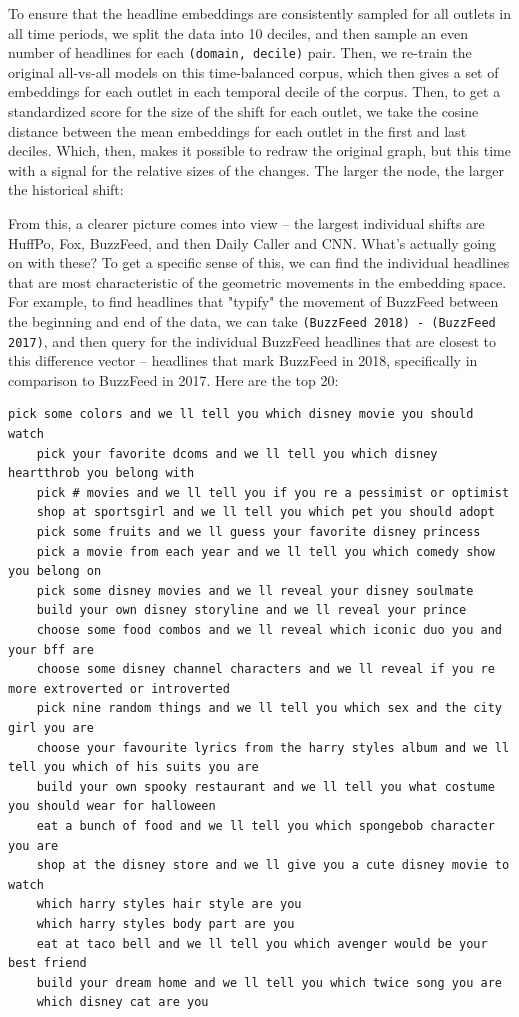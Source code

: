 \documentclass{scrartcl}
\begin{document}
To ensure that the headline embeddings are consistently sampled for all outlets in all time periods, we split the data into 10 deciles, and then sample an even number of headlines for each \texttt{(domain, decile)} pair. Then, we re-train the original all-vs-all models on this time-balanced corpus, which then gives a set of embeddings for each outlet in each temporal decile of the corpus. Then, to get a standardized score for the size of the shift for each outlet, we take the cosine distance between the mean embeddings for each outlet in the first and last deciles. Which, then, makes it possible to redraw the original graph, but this time with a signal for the relative sizes of the changes. The larger the node, the larger the historical shift:


From this, a clearer picture comes into view -- the largest individual shifts are HuffPo, Fox, BuzzFeed, and then Daily Caller and CNN. What's actually going on with these? To get a specific sense of this, we can find the individual headlines that are most characteristic of the geometric movements in the embedding space. For example, to find headlines that "typify" the movement of BuzzFeed between the beginning and end of the data, we can take \texttt{(BuzzFeed 2018) - (BuzzFeed 2017)}, and then query for the individual BuzzFeed headlines that are closest to this difference vector -- headlines that mark BuzzFeed in 2018, specifically in comparison to BuzzFeed in 2017. Here are the top 20:

\begin{lstlisting}[basicstyle=\tiny\hlfont]
    pick some colors and we ll tell you which disney movie you should watch
    pick your favorite dcoms and we ll tell you which disney heartthrob you belong with
    pick # movies and we ll tell you if you re a pessimist or optimist
    shop at sportsgirl and we ll tell you which pet you should adopt
    pick some fruits and we ll guess your favorite disney princess
    pick a movie from each year and we ll tell you which comedy show you belong on
    pick some disney movies and we ll reveal your disney soulmate
    build your own disney storyline and we ll reveal your prince
    choose some food combos and we ll reveal which iconic duo you and your bff are
    choose some disney channel characters and we ll reveal if you re more extroverted or introverted
    pick nine random things and we ll tell you which sex and the city girl you are
    choose your favourite lyrics from the harry styles album and we ll tell you which of his suits you are
    build your own spooky restaurant and we ll tell you what costume you should wear for halloween
    eat a bunch of food and we ll tell you which spongebob character you are
    shop at the disney store and we ll give you a cute disney movie to watch
    which harry styles hair style are you
    which harry styles body part are you
    eat at taco bell and we ll tell you which avenger would be your best friend
    build your dream home and we ll tell you which twice song you are
    which disney cat are you
\end{lstlisting}
\end{document}
